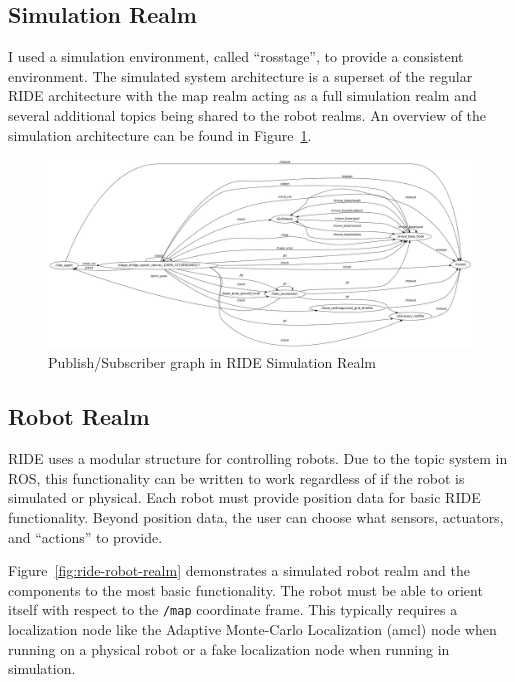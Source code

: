 
\subsection{Simulation Realm}
\label{sub:simulator}
I used a simulation environment, called ``rosstage'', to provide a consistent environment. The simulated system architecture is a superset of the regular RIDE architecture with the map realm acting as a full simulation realm and several additional topics being shared to the robot realms. An overview of the simulation architecture can be found in Figure~\ref{fig:ride-simulation-realm}.

\begin{figure}
\includegraphics[width=\textwidth]{images/ride-simulation-realm.png}
\caption{Publish/Subscriber graph in RIDE Simulation Realm\label{fig:ride-simulation-realm}}
\end{figure}

\subsection{Robot Realm}
\label{section:robot-architecture}
RIDE uses a modular structure for controlling robots. Due to the topic system in ROS, this functionality can be written to work regardless of if the robot is simulated or physical. Each robot must provide position data for basic RIDE functionality. Beyond position data, the user can choose what sensors, actuators, and ``actions'' to provide.

Figure~\ref{fig:ride-robot-realm} demonstrates a simulated robot realm and the components to the most basic functionality. The robot must be able to orient itself with respect to the \verb!/map! coordinate frame. This typically requires a localization node like the Adaptive Monte-Carlo Localization (amcl) node when running on a physical robot or a fake localization node when running in simulation.

